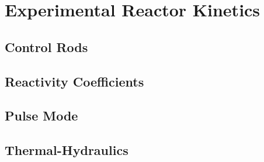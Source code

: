 \documentclass[11pt,a4paper,twoside]{book}
\begin{document}

\pagestyle{fancy} %

\part{Experimental Reactor Kinetics}
\chapter{Control Rods}
\graphicspath{{chapters/experimental_reactor_kinetics/images/}}



\chapter{Reactivity Coefficients}

\chapter{Pulse Mode}

\chapter{Thermal-Hydraulics}


%
\end{document}
